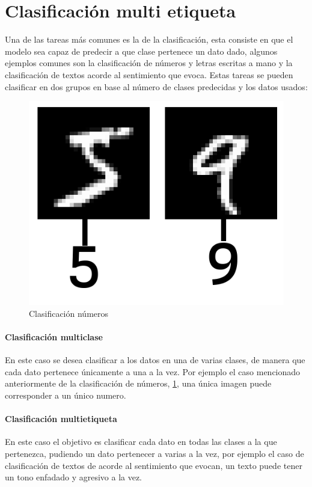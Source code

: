 \section{Clasificación multi etiqueta}
Una de las tareas más comunes es la de la clasificación, esta consiste en que el
modelo sea capaz de predecir a que clase pertenece un dato dado, algunos
ejemplos comunes son la clasificación de números y letras escritas a mano y la
clasificación de textos acorde al sentimiento que evoca. Estas tareas se pueden
clasificar en dos grupos en base al número de clases predecidas y los datos
usados:

\begin{figure}[H]
	\includegraphics[scale=0.35]{imagenes/ClasificacionImagenes.png}
	\centering
	\captionsetup{justification=centering}
	\caption{Clasificación números}
	\label{Clasificación números}
\end{figure}

\paragraph{Clasificación multiclase}
En este caso se desea clasificar a los datos en una de varias clases, de manera
que cada dato pertenece únicamente a una a la vez. Por ejemplo el caso
mencionado anteriormente de la clasificación de números, \cref{Clasificación números}, una única imagen puede
corresponder a un único numero. 


\paragraph{Clasificación multietiqueta}
En este caso el objetivo es clasificar cada dato en todas las clases a la que
pertenezca, pudiendo un dato pertenecer a varias a la vez, por ejemplo el caso de clasificación de textos de acorde al sentimiento que evocan, un texto puede tener un tono enfadado y
agresivo a la vez. \cite{MultiLabelClassification}

